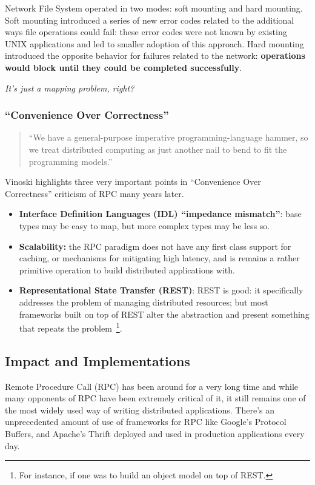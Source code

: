 Network File System operated in two modes: soft mounting and hard mounting.  Soft mounting introduced a series of new error codes related to the additional ways file operations could fail: these error codes were not known by existing UNIX applications and led to smaller adoption of this approach.  Hard mounting introduced the opposite behavior for failures related to the network: \textbf{operations would block until they could be completed successfully}.  

\textit{It's just a mapping problem, right?}~\cite{vinoski2003s}

\subsubsection{``Convenience Over Correctness''}

\begin{quote}
``We have a general-purpose imperative programming-language
hammer, so we treat distributed computing as just another nail to
bend to fit the programming models.''~\cite{vinoski2008convenience}
\end{quote}

Vinoski highlights three very important points in ``Convenience Over Correctness'' criticism of RPC many years later.

\begin{itemize}
\item \textbf{Interface Definition Languages (IDL) ``impedance mismatch''}: base types may be easy to map, but more complex types may be less so.
\item \textbf{Scalability:} the RPC paradigm does not have any first class support for caching, or mechanisms for mitigating high latency, and is remains a rather primitive operation to build distributed applications with.
\item \textbf{Representational State Transfer (REST)}: REST is good: it specifically addresses the problem of managing distributed resources; but most frameworks built on top of REST alter the abstraction and present something that repeats the problem~\footnote{For instance, if one was to build an object model on top of REST.}.	 
\end{itemize}

\subsection{Impact and Implementations}

Remote Procedure Call (RPC) has been around for a very long time and while many opponents of RPC have been extremely critical of it, it still remains one of the most widely used way of writing distributed applications.  There's an unprecedented amount of use of frameworks for RPC like Google's Protocol Buffers, and Apache's Thrift deployed and used in production applications every day.

